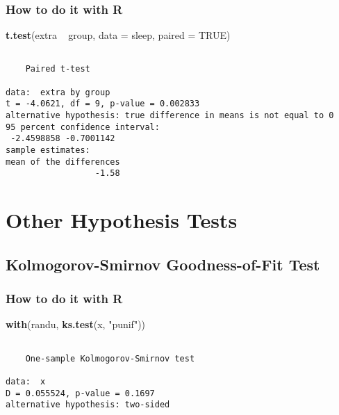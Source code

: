 \documentclass[]{book}
\newenvironment{Shaded}{\begin{snugshade}}{\end{snugshade}}
\newcommand{\KeywordTok}[1]{\textcolor[rgb]{0.13,0.29,0.53}{\textbf{{#1}}}}
\newcommand{\DataTypeTok}[1]{\textcolor[rgb]{0.13,0.29,0.53}{{#1}}}
\newcommand{\StringTok}[1]{\textcolor[rgb]{0.31,0.60,0.02}{{#1}}}
\newcommand{\OtherTok}[1]{\textcolor[rgb]{0.56,0.35,0.01}{{#1}}}
\newcommand{\NormalTok}[1]{{#1}}
\numberwithin{equation}{chapter}
\numberwithin{figure}{chapter}
\theoremstyle{plain}
\theoremstyle{definition}
\theoremstyle{remark}
\theoremstyle{definition}
\theoremstyle{definition}
\theoremstyle{remark}
\begin{document}
\subsubsection{How to do it with R}\label{how-to-do-it-with-r-43}

\begin{Shaded}
\begin{Highlighting}[]
\KeywordTok{t.test}\NormalTok{(extra ~}\StringTok{ }\NormalTok{group, }\DataTypeTok{data =} \NormalTok{sleep, }\DataTypeTok{paired =} \OtherTok{TRUE}\NormalTok{)}
\end{Highlighting}
\end{Shaded}

\begin{verbatim}

    Paired t-test

data:  extra by group
t = -4.0621, df = 9, p-value = 0.002833
alternative hypothesis: true difference in means is not equal to 0
95 percent confidence interval:
 -2.4598858 -0.7001142
sample estimates:
mean of the differences 
                  -1.58 
\end{verbatim}

\section{Other Hypothesis Tests}\label{sec-other-hypothesis-tests}

\subsection{Kolmogorov-Smirnov Goodness-of-Fit
Test}\label{sub-kolmogorov-smirnov-goodness-of-fit-test}

\subsubsection{How to do it with R}\label{how-to-do-it-with-r-44}

\begin{Shaded}
\begin{Highlighting}[]
\KeywordTok{with}\NormalTok{(randu, }\KeywordTok{ks.test}\NormalTok{(x, }\StringTok{"punif"}\NormalTok{))}
\end{Highlighting}
\end{Shaded}

\begin{verbatim}

    One-sample Kolmogorov-Smirnov test

data:  x
D = 0.055524, p-value = 0.1697
alternative hypothesis: two-sided
\end{verbatim}
\end{document}

